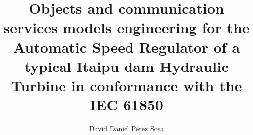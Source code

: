 %
%
%
%
%
%
% 
% 



\title{Objects and communication services models engineering
for the Automatic Speed Regulator 
of a typical Itaipu dam Hydraulic Turbine 
in conformance with the IEC 61850}


\author{David Daniel P\'erez Sosa}

